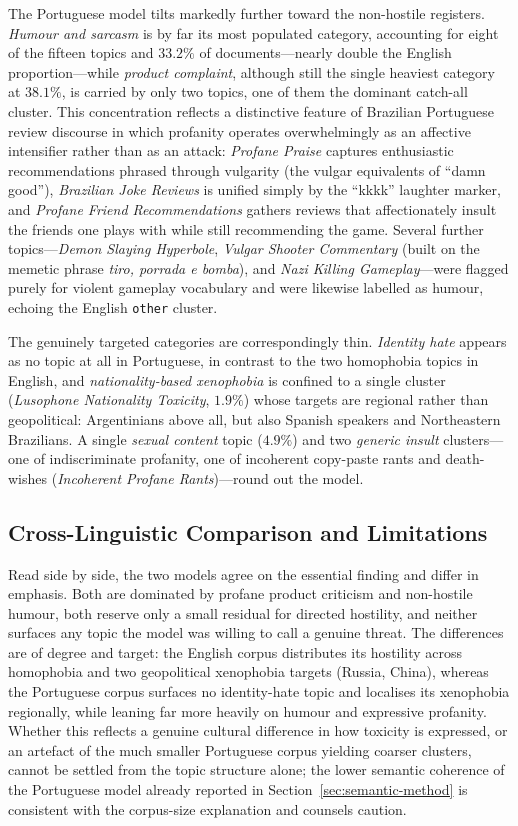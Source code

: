 The Portuguese model tilts markedly further toward the non-hostile registers. \emph{Humour and sarcasm} is by far its most populated category, accounting for eight of the fifteen topics and $33.2\%$ of documents---nearly double the English proportion---while \emph{product complaint}, although still the single heaviest category at $38.1\%$, is carried by only two topics, one of them the dominant catch-all cluster. This concentration reflects a distinctive feature of Brazilian Portuguese review discourse in which profanity operates overwhelmingly as an affective intensifier rather than as an attack: \emph{Profane Praise} captures enthusiastic recommendations phrased through vulgarity (the vulgar equivalents of ``damn good''), \emph{Brazilian Joke Reviews} is unified simply by the ``kkkk'' laughter marker, and \emph{Profane Friend Recommendations} gathers reviews that affectionately insult the friends one plays with while still recommending the game. Several further topics---\emph{Demon Slaying Hyperbole}, \emph{Vulgar Shooter Commentary} (built on the memetic phrase \emph{tiro, porrada e bomba}), and \emph{Nazi Killing Gameplay}---were flagged purely for violent gameplay vocabulary and were likewise labelled as humour, echoing the English \texttt{other} cluster.

The genuinely targeted categories are correspondingly thin. \emph{Identity hate} appears as no topic at all in Portuguese, in contrast to the two homophobia topics in English, and \emph{nationality-based xenophobia} is confined to a single cluster (\emph{Lusophone Nationality Toxicity}, $1.9\%$) whose targets are regional rather than geopolitical: Argentinians above all, but also Spanish speakers and Northeastern Brazilians. A single \emph{sexual content} topic ($4.9\%$) and two \emph{generic insult} clusters---one of indiscriminate profanity, one of incoherent copy-paste rants and death-wishes (\emph{Incoherent Profane Rants})---round out the model.

\subsection{Cross-Linguistic Comparison and Limitations}
\label{subsec:semantic-cross}

Read side by side, the two models agree on the essential finding and differ in emphasis. Both are dominated by profane product criticism and non-hostile humour, both reserve only a small residual for directed hostility, and neither surfaces any topic the model was willing to call a genuine threat. The differences are of degree and target: the English corpus distributes its hostility across homophobia and two geopolitical xenophobia targets (Russia, China), whereas the Portuguese corpus surfaces no identity-hate topic and localises its xenophobia regionally, while leaning far more heavily on humour and expressive profanity. Whether this reflects a genuine cultural difference in how toxicity is expressed, or an artefact of the much smaller Portuguese corpus yielding coarser clusters, cannot be settled from the topic structure alone; the lower semantic coherence of the Portuguese model already reported in Section~\ref{sec:semantic-method} is consistent with the corpus-size explanation and counsels caution.

